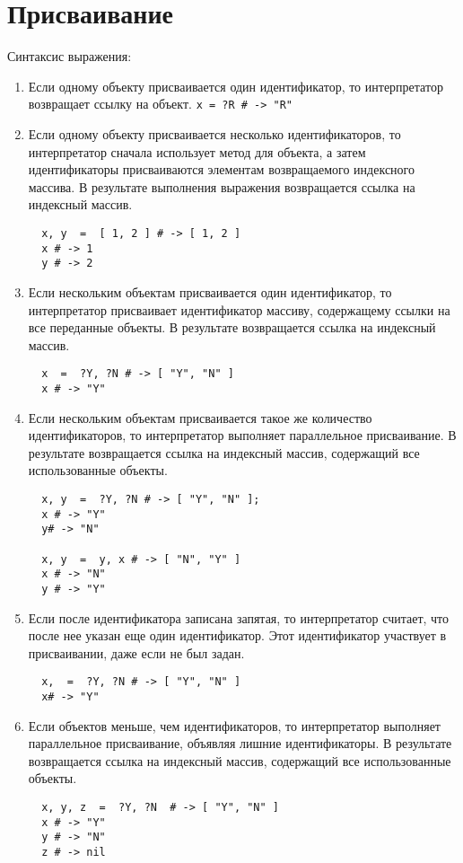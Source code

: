 \hypertarget{appequal}{}
\chapter{Присваивание}

Синтаксис выражения:
\begin{enumerate}
  \item Если одному объекту присваивается один идентификатор, то интерпретатор возвращает ссылку на объект.
  \verb!x = ?R # -> "R"!

  \item Если одному объекту присваивается несколько идентификаторов, то интерпретатор сначала использует метод  для объекта, а затем  идентификаторы присваиваются элементам возвращаемого индексного массива. В результате выполнения выражения возвращается ссылка на индексный массив.
  \begin{verbatim}
  x, y  =  [ 1, 2 ] # -> [ 1, 2 ]
  x # -> 1
  y # -> 2
  \end{verbatim}

  \item Если нескольким объектам присваивается один идентификатор, то интерпретатор присваивает идентификатор массиву, содержащему ссылки на все переданные объекты. В результате возвращается ссылка на индексный массив.
  \begin{verbatim}
  x  =  ?Y, ?N # -> [ "Y", "N" ]
  x # -> "Y"
  \end{verbatim}

  \item Если нескольким объектам присваивается такое же количество идентификаторов, то интерпретатор выполняет параллельное присваивание. В результате возвращается ссылка на индексный массив, содержащий все использованные объекты.
  \begin{verbatim}
  x, y  =  ?Y, ?N # -> [ "Y", "N" ];
  x # -> "Y"
  y# -> "N"

  x, y  =  y, x # -> [ "N", "Y" ]
  x # -> "N"
  y # -> "Y"
  \end{verbatim}

  \item Если после идентификатора записана запятая, то интерпретатор считает, что после нее указан еще один идентификатор. Этот идентификатор участвует в присваивании, даже если не был задан.
  \begin{verbatim}
  x,  =  ?Y, ?N # -> [ "Y", "N" ]
  x# -> "Y"
  \end{verbatim}
  
  \item Если объектов меньше, чем идентификаторов, то интерпретатор выполняет параллельное присваивание, объявляя лишние идентификаторы. В результате возвращается ссылка на индексный массив, содержащий все использованные объекты.
  \begin{verbatim}
  x, y, z  =  ?Y, ?N  # -> [ "Y", "N" ]
  x # -> "Y"
  y # -> "N"
  z # -> nil
  \end{verbatim}


\end{enumerate}
